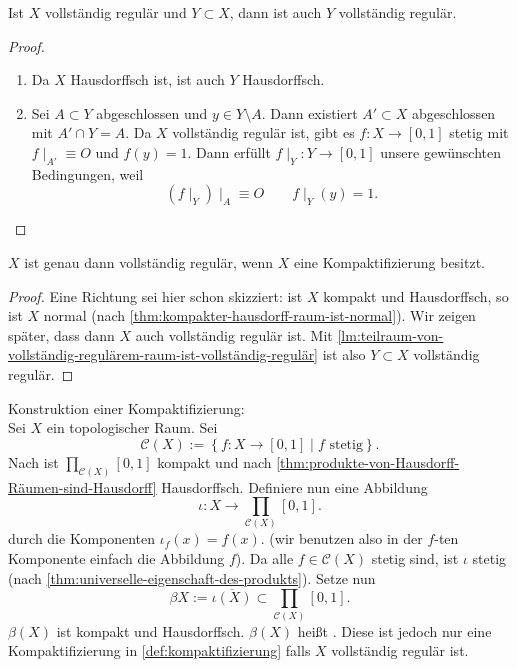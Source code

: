 \begin{lemma}\label{lm:teilraum-von-vollständig-regulärem-raum-ist-vollständig-regulär}
    Ist $X$ vollständig regulär und  $Y\subset X$, dann ist auch $Y$ vollständig regulär.
\end{lemma}
\begin{proof}
    \begin{enumerate}[1)]
        \item Da $X$ Hausdorffsch ist, ist auch  $Y$ Hausdorffsch.
        \item Sei  $A\subset Y$ abgeschlossen und $y\in Y \setminus A$. Dann existiert $A'\subset X$ abgeschlossen mit $A' \cap Y = A$. Da $X$ vollständig regulär ist,  gibt es  $f: X \to  [0,1]$ stetig mit $f\mid _{A'} \equiv  O$ und $f(y) = 1$. Dann erfüllt  $f\mid _Y : Y \to  [0,1]$ unsere gewünschten Bedingungen, weil
            \[
                \left(            f\mid _Y \right) \mid _A \equiv O \qquad f\mid _Y(y) = 1
            .\] 
    \end{enumerate}
\end{proof}
\begin{theorem}\label{thm:vollständig-regulär-wenn-kompaktifizierbar}
    $X$ ist genau dann vollständig regulär, wenn  $X$ eine Kompaktifizierung besitzt.
\end{theorem}
\begin{proof}
    Eine Richtung sei hier schon skizziert: ist $X$ kompakt und Hausdorffsch, so ist  $X$ normal (nach \autoref{thm:kompakter-hausdorff-raum-ist-normal}). Wir zeigen später, dass dann  $X$ auch vollständig regulär ist. Mit \autoref{lm:teilraum-von-vollständig-regulärem-raum-ist-vollständig-regulär} ist also $Y\subset X$ vollständig regulär.
\end{proof}
Konstruktion einer Kompaktifizierung: \\
Sei $X$ ein topologischer Raum. Sei 
\[
    \mathcal{C}(X) := \left \{f: X \to  [0,1] \mid  f \text{ stetig}\right\} 
.\] 
Nach  ist $\prod_{\mathcal{C}(X)}[0,1] $ kompakt und nach \autoref{thm:produkte-von-Hausdorff-Räumen-sind-Hausdorff} Hausdorffsch. Definiere nun eine Abbildung
\[
    ι : X \to  \prod_{\mathcal{C}(X)} [0,1]
.\] 
durch die Komponenten $ι_f(x) = f(x)$. (wir benutzen also in der  $f$-ten Komponente einfach die Abbildung  $f$). Da alle  $f\in \mathcal{C}(X)$ stetig sind, ist $ι$ stetig (nach \autoref{thm:universelle-eigenschaft-des-produkts}). Setze nun
\[
    βX := \overline{ι(X)} \subset \prod_{\mathcal{C}(X)} [0,1]
.\] 
$β(X)$ ist kompakt und Hausdorffsch. $β(X)$ heißt  . Diese ist jedoch nur eine Kompaktifizierung in \autoref{def:kompaktifizierung} falls $X$ vollständig regulär ist.
